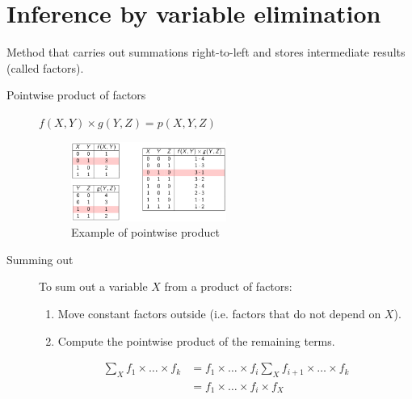\section{Inference by variable elimination}
Method that carries out summations right-to-left and stores intermediate results (called factors).

\begin{description}
    \item[Pointwise product of factors] $f(X, Y) \times g(Y, Z) = p(X, Y, Z)$
        \begin{figure}[H]
            \centering
            \includegraphics[width=0.5\textwidth]{img/_pointwise_factors.pdf}
            \caption{Example of pointwise product}
        \end{figure}

    \item[Summing out]
        To sum out a variable $X$ from a product of factors:
        \begin{enumerate}
            \item Move constant factors outside (i.e. factors that do not depend on $X$).
            \item Compute the pointwise product of the remaining terms.
        \end{enumerate}

        \begin{example}
            \[ 
                \begin{split}
                    \sum_X f_1 \times \dots \times f_k &= f_1 \times \dots \times f_i \sum_X f_{i+1} \times \dots \times f_k \\
                        &= f_1 \times \dots \times f_i \times f_X
                \end{split}    
            \]
        \end{example}
\end{description}

